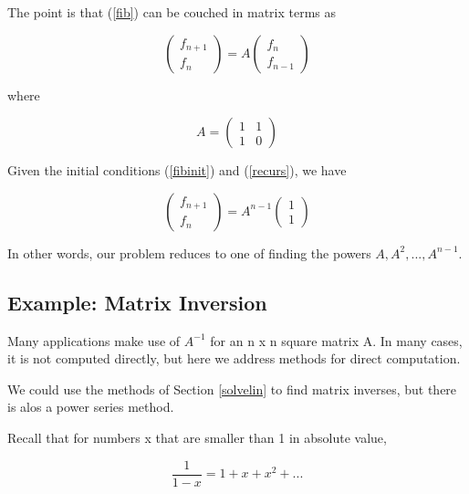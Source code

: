 The point is that (\ref{fib}) can be couched in matrix terms as

\begin{equation}
\label{recurs}
\left (
\begin{array}{c}
f_{n+1} \\
f_n
\end{array} 
\right ) 
=
A 
\left (
\begin{array}{c}
f_n \\
f_{n-1}
\end{array} 
\right ) 
\end{equation}

where

\begin{equation}
A = 
\left (
\begin{array}{rr}
1 & 1 \\
1 & 0
\end{array} 
\right ) 
\end{equation}

Given the initial conditions (\ref{fibinit}) and (\ref{recurs}), we 
have

\begin{equation}
\left (
\begin{array}{c}
f_{n+1} \\
f_n
\end{array} 
\right ) 
=
A^{n-1} 
\left (
\begin{array}{c}
1 \\
1
\end{array} 
\right )
\end{equation}

In other words, our problem reduces to one of finding the powers
$A, A^2,...,A^{n-1}$. 

\subsection{Example:  Matrix Inversion}

Many applications make use of $A^{-1}$ for an n x n square matrix A.  In
many cases, it is not computed directly, but here we address methods for
direct computation.

We could use the methods of Section \ref{solvelin} to find matrix
inverses, but there is alos a power series method.

Recall that for numbers x that are smaller than 1 in absolute value,

\begin{equation}
\frac{1}{1-x} = 1 + x + x^2 + ...
\end{equation}

